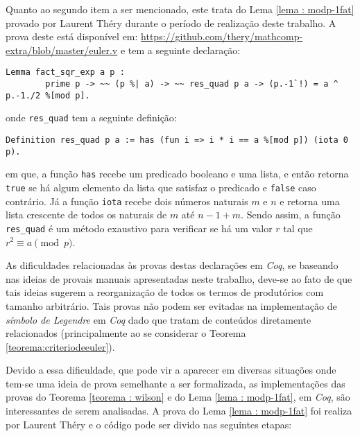 Quanto ao segundo item a ser mencionado, este trata do Lema \ref{lema : modp-1fat} provado por Laurent Théry durante o período de realização deste trabalho. A prova deste está disponível em: \url{https://github.com/thery/mathcomp-extra/blob/master/euler.v} e tem a seguinte declaração:
        \begin{lstlisting}[language=coq,frame=single,tabsize=1]
Lemma fact_sqr_exp a p :
        prime p -> ~~ (p %| a) -> ~~ res_quad p a -> (p.-1`!) = a ^ p.-1./2 %[mod p].
        \end{lstlisting}
onde \lstinline[language=coq]!res_quad! tem a seguinte definição:
        \begin{lstlisting}[language=coq,frame=single,tabsize=1]
Definition res_quad p a := has (fun i => i * i == a %[mod p]) (iota 0 p).
        \end{lstlisting}
em que, a função \lstinline[language=coq]!has! recebe um predicado booleano e uma lista, e então retorna \lstinline[language=coq]!true!
se há algum elemento da lista que satisfaz o predicado e \lstinline[language=coq]!false! caso contrário. Já a função \lstinline[language=coq]!iota! recebe dois números naturais $m$ e $n$ e retorna uma lista crescente de todos os naturais de $m$ até $n-1+m$. Sendo assim, a função \lstinline[language=coq]!res_quad! é um método exaustivo para verificar se há um valor $r$ tal que $r^{2} \equiv a \pmod{p}$.

As dificuldades relacionadas às provas destas declarações em \textit{Coq}, se baseando nas ideias de provais manuais apresentadas neste trabalho, deve-se ao fato de que tais ideias sugerem a reorganização de todos os termos de produtórios com tamanho arbitrário. Tais provas não podem ser evitadas na implementação de \textit{símbolo de Legendre} em \textit{Coq} dado que tratam de conteúdos diretamente relacionados (principalmente ao se considerar o Teorema \ref{teorema:criteriodeeuler}).

Devido a essa dificuldade, que pode vir a aparecer em diversas situações onde tem-se uma ideia de prova semelhante a ser formalizada, as implementações das provas do Teorema \ref{teorema : wilson} e do Lema \ref{lema : modp-1fat}, em \textit{Coq}, são interessantes de serem analisadas. A prova do Lema \ref{lema : modp-1fat} foi realiza por Laurent Théry e o código pode ser divido nas seguintes etapas:


